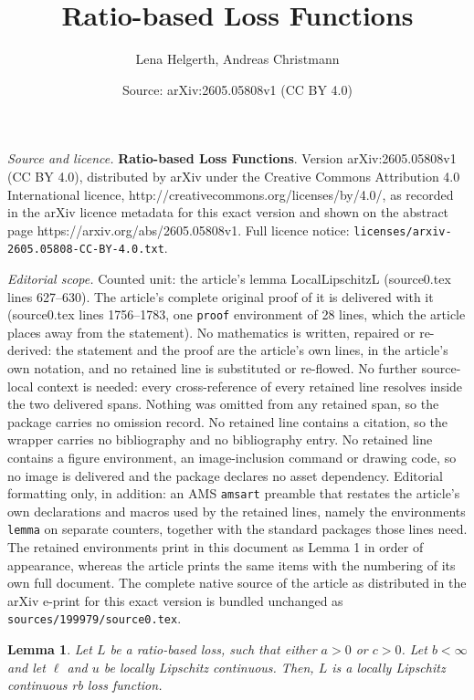 \documentclass[10pt,a4paper]{amsart}
\title{\textbf{Ratio-based Loss Functions}}
\author{Lena Helgerth, Andreas Christmann}
\date{Source: arXiv:2605.05808v1 (CC BY 4.0)}
\newtheorem{lemma}{Lemma}
\begin{document}
\maketitle

\noindent\emph{Source and licence.} \textbf{Ratio-based Loss Functions}. Version arXiv:2605.05808v1 (CC BY 4.0), distributed by arXiv under the Creative Commons Attribution 4.0 International licence, http://creativecommons.org/licenses/by/4.0/, as recorded in the arXiv licence metadata for this exact version and shown on the abstract page https://arxiv.org/abs/2605.05808v1. Full licence notice: \texttt{licenses/arxiv-2605.05808-CC-BY-4.0.txt}.\par\smallskip

\noindent\textit{Editorial scope.} Counted unit: the article's lemma LocalLipschitzL (source0.tex lines 627--630). The article's complete original proof of it is delivered with it (source0.tex lines 1756--1783, one \texttt{proof} environment of 28 lines, which the article places away from the statement). No mathematics is written, repaired or re-derived: the statement and the proof are the article's own lines, in the article's own notation, and no retained line is substituted or re-flowed.  No further source-local context is needed: every cross-reference of every retained line resolves inside the two delivered spans.  Nothing was omitted from any retained span, so the package carries no omission record.  No retained line contains a citation, so the wrapper carries no bibliography and no bibliography entry.  No retained line contains a figure environment, an image-inclusion command or drawing code, so no image is delivered and the package declares no asset dependency.  Editorial formatting only, in addition: an AMS \texttt{amsart} preamble that restates the article's own declarations and macros used by the retained lines, namely the environments \texttt{lemma} on separate counters, together with the standard packages those lines need.  The retained environments print in this document as Lemma 1 in order of appearance, whereas the article prints the same items with the numbering of its own full document.  The complete native source of the article as distributed in the arXiv e-print for this exact version is bundled unchanged as \texttt{sources/199979/source0.tex}.
\begin{lemma} \label{LocalLipschitzL}
	Let $L$ be a ratio-based loss, such that either $a > 0$ or $c > 0$. Let $b < \infty$ and  let $\ell$ and $u$ be locally Lipschitz continuous. 
	Then, $L$ is a locally Lipschitz continuous rb loss function.
\end{lemma}
\end{document}
